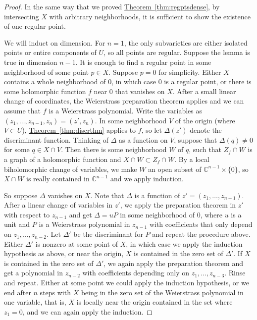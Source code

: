 \documentclass[12pt,openany]{book}
\newcommand{\C}{{\mathbb{C}}}
\theoremstyle{plain}
\theoremstyle{remark}
\theoremstyle{definition}
\theoremstyle{exercise}
\theoremstyle{example}
\newcommand{\thmref}[1]{\hyperref[#1]{Theorem~\ref*{#1}}}
\begin{document}
\begin{proof}
In the same way that we proved \thmref{thm:regptsdense},
by intersecting $X$ with arbitrary neighborhoods,
it is sufficient to show the existence of one regular point.

We will induct on dimension.  For $n=1$,
the only subvarieties are either isolated points or entire components of
$U$, so all points are regular.
Suppose the lemma is true in dimension $n-1$.
It is enough to find a regular point in some neighborhood of some point
$p \in X$.
Suppose $p = 0$ for simplicity.
Either $X$ contains a whole neighborhood of $0$, in which case
$0$ is a regular point, or there is some holomorphic function
$f$ near $0$ that vanishes on $X$.
After a small linear change of coordinates, the
Weierstrass preparation theorem applies and we can assume that $f$ is a
Weierstrass polynomial.  Write the variables as
$(z_1,\ldots,z_{n-1},z_n) = (z',z_n)$.
In some neighborhood $V$ of the origin (where $V \subset U$),
\thmref{thm:discrthm} applies to $f$, so
let $\Delta(z')$ denote the discriminant function.
Thinking of $\Delta$ as a function
on $V$, suppose that $\Delta(q) \not= 0$ for some $q \in X \cap V$.
Then there is some
neighborhood $W$ of $q$, such that $Z_f \cap W$ is a
graph of a holomorphic function and $X \cap W \subset Z_f \cap W$.
By a local biholomorphic change of variables, we make $W$ an open
subset of $\C^{n-1} \times \{ 0 \}$, so $X \cap W$ is really contained in
$\C^{n-1}$ and we apply induction.

So suppose $\Delta$ vanishes on $X$.  Note that
$\Delta$ is a function of $z'=(z_1,\ldots,z_{n-1})$.
After a linear change of variables in $z'$,
we apply the preparation theorem in $z'$ with respect to $z_{n-1}$
and get $\Delta = u P$ in some neighborhood of $0$,
where $u$ is a unit and $P$ is a Weierstrass polynomial
in $z_{n-1}$ with coefficients that only depend on
$z_1,\ldots,z_{n-2}$.
Let $\Delta'$ be the discriminant for $P$ and repeat the procedure
above.  Either $\Delta'$ is nonzero at some point of $X$,
in which case we apply the induction hypothesis as above,
or near the
origin, $X$ is contained in the zero set of $\Delta'$.  If $X$ is contained
in the zero set of $\Delta'$, we again apply the preparation theorem
and get a polynomial in $z_{n-2}$ with coefficients depending only on
$z_1,\ldots,z_{n-3}$.  Rinse and repeat.  Either at some point we could
apply the induction hypothesis, or we end after $n$ steps with $X$ being
in the zero set of the Weierstrass polynomial in one variable, that is,
$X$ is locally near the origin contained in the
set where $z_1 = 0$, and we can again apply the induction.
\end{proof}
\end{document}
